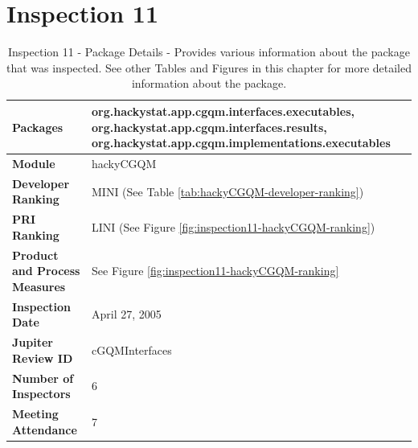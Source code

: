 \clearpage
\section{Inspection 11}
\label{appendix:section:inspection11}

\begin{table}[!h]
  \begin{center}
    \caption[Inspection 11 - Package Details]{Inspection 11 - Package Details 
      - Provides various information about the package that was
      inspected. See other Tables and Figures in this chapter for more
      detailed information about the package.}
    \label{tab:inspection-package-details-11}
    \begin{tabular}{|p{5.0cm}|p{8.0cm}|} \hline
{\bf Packages} & org.hackystat.app.cgqm.interfaces.executables, \newline
org.hackystat.app.cgqm.interfaces.results, \newline
org.hackystat.app.cgqm.implementations.executables \\ \hline
{\bf Module} & hackyCGQM \\ \hline
{\bf Developer Ranking} & MINI (See Table \ref{tab:hackyCGQM-developer-ranking}) \\ \hline
{\bf PRI Ranking} & LINI (See Figure \ref{fig:inspection11-hackyCGQM-ranking}) \\ \hline
{\bf Product and Process Measures} & See Figure \ref{fig:inspection11-hackyCGQM-ranking} \\ \hline
{\bf Inspection Date} & April 27, 2005 \\ \hline
{\bf Jupiter Review ID} & cGQMInterfaces \\ \hline
{\bf Number of Inspectors} & 6 \\ \hline
{\bf Meeting Attendance} & 7 \\ \hline
    \end{tabular}
  \end{center}
\end{table}

